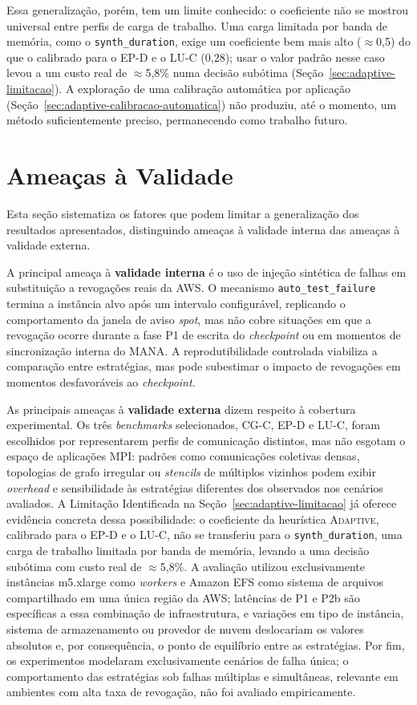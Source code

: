 Essa generalização, porém, tem um limite conhecido: o coeficiente não se
mostrou universal entre perfis de carga de trabalho. Uma carga limitada por
banda de memória, como o \texttt{synth\_duration}, exige um coeficiente bem
mais alto ($\approx$0,5) do que o calibrado para o EP-D e o LU-C (0,28); usar
o valor padrão nesse caso levou a um custo real de $\approx$5,8\% numa decisão
subótima (Seção~\ref{sec:adaptive-limitacao}). A exploração de uma calibração
automática por aplicação (Seção~\ref{sec:adaptive-calibracao-automatica}) não
produziu, até o momento, um método suficientemente preciso, permanecendo como
trabalho futuro.


\section{Ameaças à Validade}
\label{sec:ameacas-validade}

Esta seção sistematiza os fatores que podem limitar a generalização dos resultados
apresentados, distinguindo ameaças à validade interna das ameaças à validade externa.

A principal ameaça à \textbf{validade interna} é o uso de injeção sintética de
falhas em substituição a revogações reais da AWS. O mecanismo
\texttt{auto\_test\_failure} termina a instância alvo após um intervalo configurável,
replicando o comportamento da janela de aviso \textit{spot}, mas não cobre situações em
que a revogação ocorre durante a fase P1 de escrita do \textit{checkpoint} ou em
momentos de sincronização interna do MANA. A reprodutibilidade controlada viabiliza a
comparação entre estratégias, mas pode subestimar o impacto de revogações em momentos
desfavoráveis ao \textit{checkpoint}.

As principais ameaças à \textbf{validade externa} dizem respeito à cobertura
experimental. Os três \textit{benchmarks} selecionados, CG-C, EP-D e LU-C, foram
escolhidos por representarem perfis de comunicação distintos, mas não esgotam o espaço
de aplicações MPI: padrões como comunicações coletivas densas, topologias de grafo
irregular ou \textit{stencils} de múltiplos vizinhos podem exibir \textit{overhead} e
sensibilidade às estratégias diferentes dos observados nos cenários avaliados. A
Limitação Identificada na Seção~\ref{sec:adaptive-limitacao} já oferece evidência
concreta dessa possibilidade: o coeficiente da heurística \textsc{Adaptive},
calibrado para o EP-D e o LU-C, não se transferiu para o \texttt{synth\_duration},
uma carga de trabalho limitada por banda de memória, levando a uma decisão
subótima com custo real de $\approx$5,8\%. A avaliação
utilizou exclusivamente instâncias m5.xlarge como \textit{workers} e Amazon EFS como
sistema de arquivos compartilhado em uma única região da AWS; latências de P1 e P2b são
específicas a essa combinação de infraestrutura, e variações em tipo de instância,
sistema de armazenamento ou provedor de nuvem deslocariam os valores absolutos e, por
consequência, o ponto de equilíbrio entre as estratégias. Por fim, os experimentos
modelaram exclusivamente cenários de falha única; o comportamento das estratégias sob
falhas múltiplas e simultâneas, relevante em ambientes com alta taxa de revogação,
não foi avaliado empiricamente.

